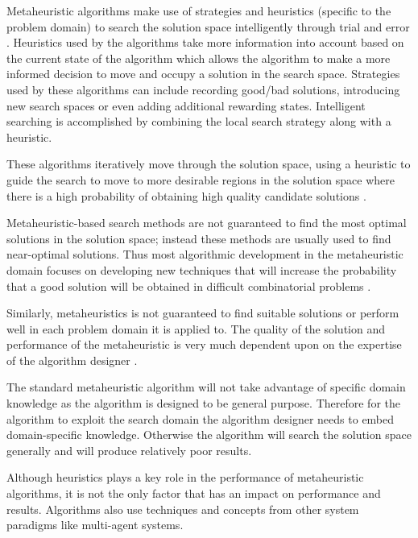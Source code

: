 Metaheuristic algorithms make use of strategies and heuristics (specific to the problem domain) to search the solution space intelligently through trial and error \cite{MetaAgricultural}. Heuristics used by the algorithms take more information into account based on the current state of the algorithm which allows the algorithm to make a more informed decision to move and occupy a solution in the search space\cite{AIModernApproach}. Strategies used by these algorithms can include recording good/bad solutions, introducing new search spaces or even adding additional rewarding states\cite{AIModernApproach}. Intelligent searching is accomplished by combining the local search strategy along with a heuristic\cite{NatureInspiredMetaHeuristic,AIModernApproach,CompuIntelligenceIntro}. 

These algorithms iteratively move through the solution space, using a heuristic to guide the search to move to more desirable regions in the solution space where there is a high probability of obtaining high quality candidate solutions \cite{TabuMontemanniSmith,SweepMeta}.

Metaheuristic-based search methods are not guaranteed to find the most optimal solutions in the solution space; instead these methods are usually used to find near-optimal solutions. Thus most algorithmic development in the metaheuristic domain focuses on developing new techniques that will increase the probability that a good solution will be obtained in difficult combinatorial problems \cite{MetaAgricultural}.

Similarly, metaheuristics is not guaranteed to find suitable solutions or perform well in each problem domain it is applied to. The quality of the solution and performance of the metaheuristic is very much dependent upon on the expertise of the algorithm designer \cite{AutoComplexMeta}. 

The standard metaheuristic algorithm will not take advantage of specific domain knowledge as the algorithm is designed to be general purpose. Therefore for the algorithm to exploit the search domain the algorithm designer needs to embed domain-specific knowledge\cite{AutoComplexMeta,AIModernApproach}. Otherwise the algorithm will search the solution space generally and will produce relatively poor results\cite{AutoComplexMeta,AIModernApproach}.

Although heuristics plays a key role in the performance of metaheuristic algorithms, it is not the only factor that has an impact on performance and results. Algorithms also use techniques and concepts from other system paradigms like multi-agent systems\cite{Self-AdaptiveMeta}. 

